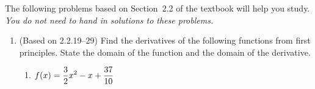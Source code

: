 \documentclass{article}
\title{\commonPSTitleZeroTwoTwo}
\author{\commonAuthor}
\date{\commonDateZeroTwoTwo}
\newcommand{\ds}{\displaystyle}
\begin{document}
\maketitle
\thispagestyle{empty}

\noindent
The following problems based on Section~2.2 of the textbook will help
you study.  \emph{You do not need to hand in solutions to these
  problems.}
\begin{enumerate}
\item (Based on 2.2.19--29) %
  Find the derivatives of the following functions from first principles.
  State the domain of the function and the domain of the derivative.
  \begin{multicols}{4}
  \begin{enumerate}
  \item $\ds f(x)=\frac{3}{2}x^2-x+\frac{37}{10} \vphantom{\frac{3}{\sqrt{t}}}$

\end{enumerate}
\end{multicols}
\end{enumerate}
\end{document}
